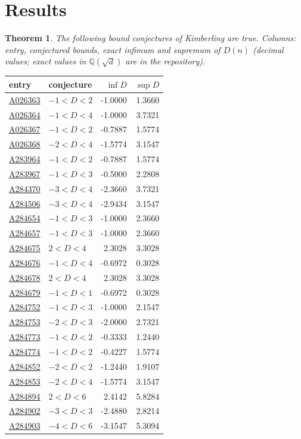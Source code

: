 \documentclass[11pt]{article}
\newtheorem{theorem}{Theorem}
\newcommand{\oeis}[1]{\href{https://oeis.org/#1}{#1}}
\begin{document}
\section{Results}
\begin{theorem}
The following bound conjectures of Kimberling are true. Columns: entry, conjectured bounds, exact infimum and
supremum of $D(n)$ (decimal values; exact values in $\mathbb{Q}(\sqrt d)$ are in the repository).
\end{theorem}
\begin{longtable}{llrr}
\toprule entry & conjecture & $\inf D$ & $\sup D$ \\ \midrule
\oeis{A026363} & $-1<D<2$ & -1.0000 & 1.3660 \\
\oeis{A026364} & $-1<D<4$ & -1.0000 & 3.7321 \\
\oeis{A026367} & $-1<D<2$ & -0.7887 & 1.5774 \\
\oeis{A026368} & $-2<D<4$ & -1.5774 & 3.1547 \\
\oeis{A283964} & $-1<D<2$ & -0.7887 & 1.5774 \\
\oeis{A283967} & $-1<D<3$ & -0.5000 & 2.2808 \\
\oeis{A284370} & $-3<D<4$ & -2.3660 & 3.7321 \\
\oeis{A284506} & $-3<D<4$ & -2.9434 & 3.1547 \\
\oeis{A284654} & $-1<D<3$ & -1.0000 & 2.3660 \\
\oeis{A284657} & $-1<D<3$ & -1.0000 & 2.3660 \\
\oeis{A284675} & $2<D<4$ & 2.3028 & 3.3028 \\
\oeis{A284676} & $-1<D<4$ & -0.6972 & 0.3028 \\
\oeis{A284678} & $2<D<4$ & 2.3028 & 3.3028 \\
\oeis{A284679} & $-1<D<1$ & -0.6972 & 0.3028 \\
\oeis{A284752} & $-1<D<3$ & -1.0000 & 2.1547 \\
\oeis{A284753} & $-2<D<3$ & -2.0000 & 2.7321 \\
\oeis{A284773} & $-1<D<2$ & -0.3333 & 1.2440 \\
\oeis{A284774} & $-1<D<2$ & -0.4227 & 1.5774 \\
\oeis{A284852} & $-2<D<2$ & -1.2440 & 1.9107 \\
\oeis{A284853} & $-2<D<4$ & -1.5774 & 3.1547 \\
\oeis{A284894} & $2<D<6$ & 2.4142 & 5.8284 \\
\oeis{A284902} & $-3<D<3$ & -2.4880 & 2.8214 \\
\oeis{A284903} & $-4<D<6$ & -3.1547 & 5.3094 \\

\end{longtable}
\end{document}
